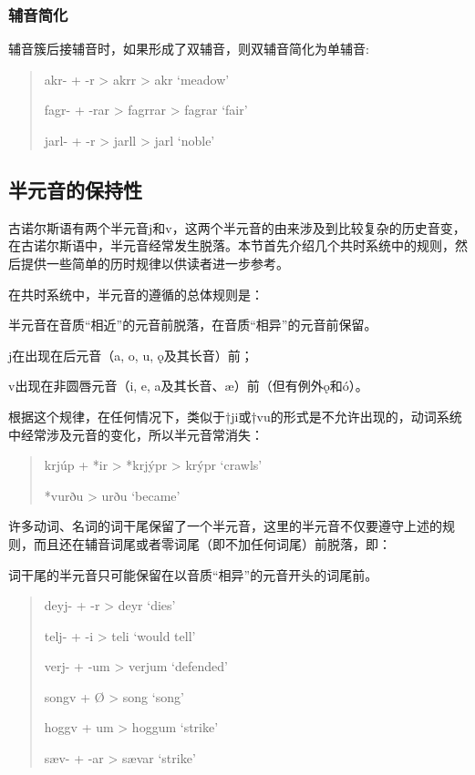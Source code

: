 \subsubsection{辅音简化}
\label{辅音简化}
辅音簇后接辅音时，如果形成了双辅音，则双辅音简化为单辅音:

\begin{quote}
  akr- + -r > akrr > akr `meadow'

  fagr- + -rar > fagrrar > fagrar `fair'

  jarl- + -r > jarll > jarl `noble'
\end{quote}

\subsection{半元音的保持性}
\label{半元音的保持性}

古诺尔斯语有两个半元音j和v，这两个半元音的由来涉及到比较复杂的历史音变，在古诺尔斯语中，半元音经常发生脱落。本节首先介绍几个共时系统中的规则，然后提供一些简单的历时规律以供读者进一步参考。

在共时系统中，半元音的遵循的总体规则是：

\begin{info}
  \noindent 半元音在音质``相近''的元音前脱落，在音质``相异''的元音前保留。

  \noindent j在出现在后元音（a, o, u, ǫ及其长音）前；

  \noindent v出现在非圆唇元音（i, e, a及其长音、æ）前（但有例外ǫ和ó）。
\end{info}

根据这个规律，在任何情况下，类似于†ji或†vu的形式是不允许出现的，动词系统中经常涉及元音的变化，所以半元音常消失：

\begin{quote}
  krjúp + *ir > *krjýpr > krýpr `crawls'

  *vurðu > urðu `became'
\end{quote}

许多动词、名词的词干尾保留了一个半元音，这里的半元音不仅要遵守上述的规则，而且还在辅音词尾或者零词尾（即不加任何词尾）前脱落，即：

\begin{info}
  词干尾的半元音只可能保留在以音质``相异''的元音开头的词尾前。
\end{info}

\begin{quote}
  deyj- + -r > deyr `dies'

  telj- + -i > teli `would tell'

  verj- + -um > verjum `defended'

  songv + Ø > song `song'

  hoggv + um > hoggum `strike'

  sæv- + -ar > sævar `strike'
\end{quote}

